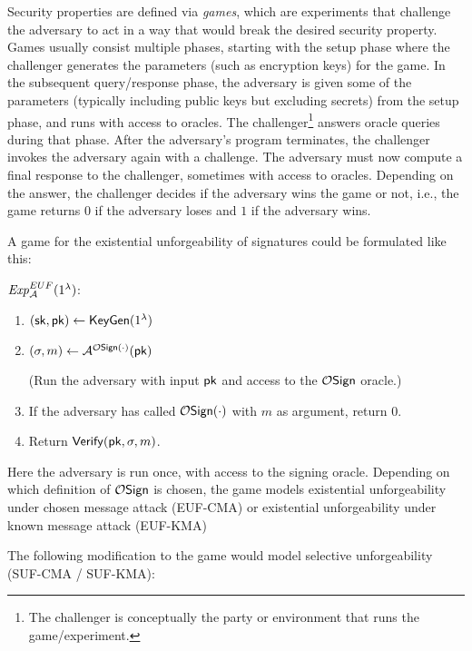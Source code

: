 Security properties are defined via \emph{games}, which are experiments that
challenge the adversary to act in a way that would break the desired security
property.  Games usually consist multiple phases, starting with the setup phase
where the challenger generates the parameters (such as encryption keys) for the
game.  In the subsequent query/response phase, the adversary is given some of
the parameters (typically including public keys but excluding secrets) from the
setup phase, and runs with access to oracles.  The challenger\footnote{ The
challenger is conceptually the party or environment that runs the
game/experiment.} answers oracle queries during that phase.  After the
adversary's program terminates, the challenger invokes the adversary again with
a challenge.  The adversary must now compute a final response to the
challenger, sometimes with access to oracles.  Depending on the answer, the
challenger decides if the adversary wins the game or not, i.e., the game returns
$0$ if the adversary loses and $1$ if the adversary wins.

A game for the existential unforgeability of signatures could be formulated like this:

\bigskip
\noindent $\mathit{Exp}_{\mathcal{A}}^{EUF}(1^\lambda)$:
\vspace{-0.5\topsep}
\begin{enumerate}
  \setlength\itemsep{0em}
  \item $(\mathsf{sk}, \mathsf{pk}) \leftarrow \mathsf{KeyGen}(1^\lambda)$
  \item $(\sigma, m) \leftarrow \mathcal{A}^{\mathcal{O}\mathsf{Sign(\cdot)}}(\mathsf{pk})$

    (Run the adversary with input $\mathsf{pk}$ and access to the $\mathcal{O}\mathsf{Sign}$ oracle.)
  \item If the adversary has called $\mathcal{O}\mathsf{Sign}(\cdot)$ with $m$ as argument,
    return $0$.
  \item Return $\mathsf{Verify}(\mathsf{pk}, \sigma, m)$.
\end{enumerate}
Here the adversary is run once, with access to the signing oracle.  Depending
on which definition of $\mathcal{O}\mathsf{Sign}$ is chosen, the game models existential
unforgeability under chosen message attack (EUF-CMA) or existential
unforgeability under known message attack (EUF-KMA)

The following modification to the game would model selective unforgeability
(SUF-CMA / SUF-KMA):


